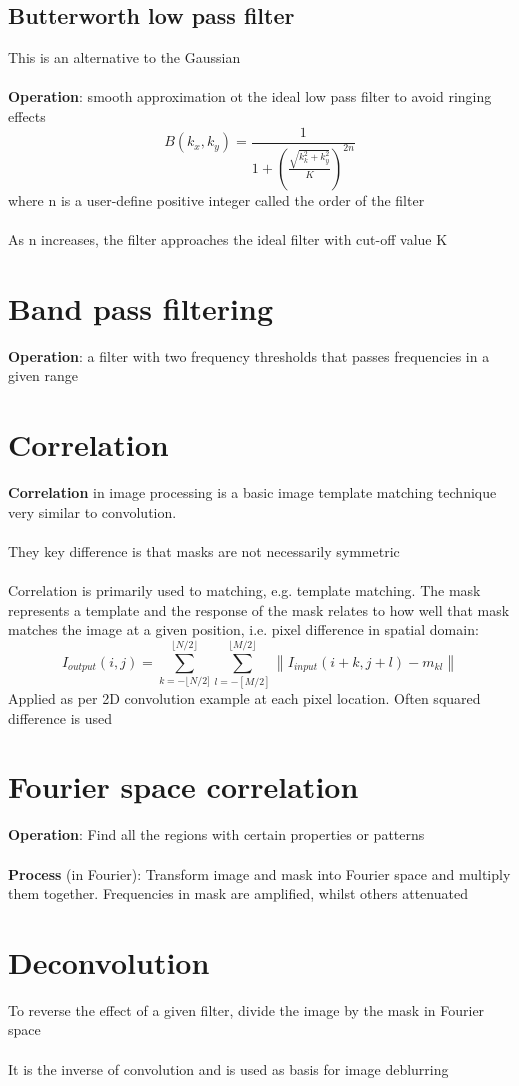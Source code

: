 \documentclass{article}[18pt]
\begin{document}
\subsection{Butterworth low pass filter}
This is an alternative to the Gaussian\\
\\
\textbf{Operation}: smooth approximation ot the ideal low pass filter to avoid ringing effects
\[
B\left(k_{x}, k_{y}\right)=\frac{1}{1+\left(\frac{\sqrt{k_{k}^{2}+k_{y}^{2}}}{K}\right)^{2 n}}
\]
where n is a user-define positive integer called the order of the filter\\
\\
As n increases, the filter approaches the ideal filter with cut-off value K
\section{Band pass filtering}
\textbf{Operation}: a filter with two frequency thresholds that passes frequencies in a given range
\section{Correlation}
\textbf{Correlation} in image processing is a basic image template matching technique very similar to convolution.\\
\\
They key difference is that masks are not necessarily symmetric\\
\\
Correlation is primarily used to matching, e.g. template matching. The mask represents a template and the response of the mask relates to how well that mask matches the image at a given position, i.e. pixel difference in spatial domain:
\[
I_{output} (i, j)=\sum_{k=-\lfloor N / 2]}^{\lfloor N / 2\rfloor} \sum_{l=-[M / 2]}^{\lfloor M / 2\rfloor}\left\|I_{i n p u t}(i+k, j+l)-m_{k l}\right\|
\]
Applied as per 2D convolution example at each pixel location. Often squared difference is used
\section{Fourier space correlation}
\textbf{Operation}: Find all the regions with certain properties or patterns\\
\\
\textbf{Process} (in Fourier): Transform image and mask into Fourier space and multiply them together. Frequencies in mask are amplified, whilst others attenuated
\section{Deconvolution}
To reverse the effect of a given filter, divide the image by the mask in Fourier space\\
\\
It is the inverse of convolution and is used as basis for image deblurring
\end{document}
